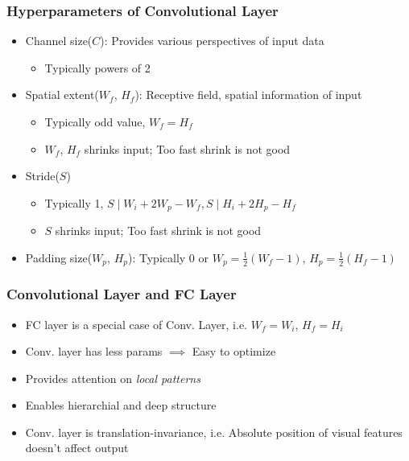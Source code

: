 \subsubsection*{Hyperparameters of Convolutional Layer}
\begin{itemize}
    \item Channel size($C$): Provides various perspectives of input data
    \begin{itemize}
        \item Typically powers of 2
    \end{itemize}
    \item Spatial extent($W_f$, $H_f$): Receptive field, spatial information of input
    \begin{itemize}
        \item Typically odd value, $W_f=H_f$
        \item $W_f$, $H_f$ shrinks input; Too fast shrink is not good
    \end{itemize}
    \item Stride($S$)
    \begin{itemize}
        \item Typically 1, $S\mid W_i+2W_p-W_f,S\mid H_i+2H_p-H_f$
        \item $S$ shrinks input; Too fast shrink is not good
    \end{itemize}
    \item Padding size($W_p$, $H_p$): Typically 0 or $W_p=\frac{1}{2}(W_f-1)$, $H_p=\frac{1}{2}(H_f-1)$
\end{itemize}

\subsubsection*{Convolutional Layer and FC Layer}
\begin{itemize}
    \item FC layer is a special case of Conv. Layer, i.e. $W_f=W_i$, $H_f=H_i$
    \item Conv. layer has less params $\implies$ Easy to optimize
    \item Provides attention on \textit{local patterns}
    \item Enables hierarchial and deep structure
    \item Conv. layer is translation-invariance, i.e. Absolute position of visual features doesn't affect output
\end{itemize}

